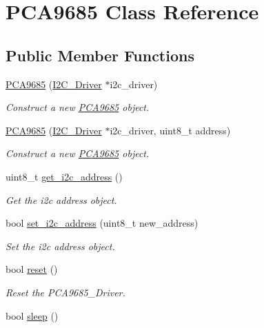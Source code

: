 \hypertarget{class_p_c_a9685}{}\section{P\+C\+A9685 Class Reference}
\label{class_p_c_a9685}
\subsection*{Public Member Functions}
\begin{DoxyCompactItemize}
\item 
\hyperlink{class_p_c_a9685_aa56013941d7e226767547d248804db05}{P\+C\+A9685} (\hyperlink{class_i2_c___driver}{I2\+C\+\_\+\+Driver} $\ast$i2c\+\_\+driver)
\begin{DoxyCompactList}\small\item\em Construct a new \hyperlink{class_p_c_a9685}{P\+C\+A9685} object. \end{DoxyCompactList}\item 
\hyperlink{class_p_c_a9685_a63e02902cf72b82d5c55521e3e811052}{P\+C\+A9685} (\hyperlink{class_i2_c___driver}{I2\+C\+\_\+\+Driver} $\ast$i2c\+\_\+driver, uint8\+\_\+t address)
\begin{DoxyCompactList}\small\item\em Construct a new \hyperlink{class_p_c_a9685}{P\+C\+A9685} object. \end{DoxyCompactList}\item 
uint8\+\_\+t \hyperlink{class_p_c_a9685_aaade04ca128d0dedf6532d2134685663}{get\+\_\+i2c\+\_\+address} ()
\begin{DoxyCompactList}\small\item\em Get the i2c address object. \end{DoxyCompactList}\item 
bool \hyperlink{class_p_c_a9685_a665c5df20c91bee8edcc18418412dc83}{set\+\_\+i2c\+\_\+address} (uint8\+\_\+t new\+\_\+address)
\begin{DoxyCompactList}\small\item\em Set the i2c address object. \end{DoxyCompactList}\item 
bool \hyperlink{class_p_c_a9685_a620e271f8a71d358d7a26930086a9e9e}{reset} ()
\begin{DoxyCompactList}\small\item\em Reset the P\+C\+A9685\+\_\+\+Driver. \end{DoxyCompactList}\item 
bool \hyperlink{class_p_c_a9685_a54b9b99fc21b0b2b24911036232990c3}{sleep} ()

\end{DoxyCompactItemize}
